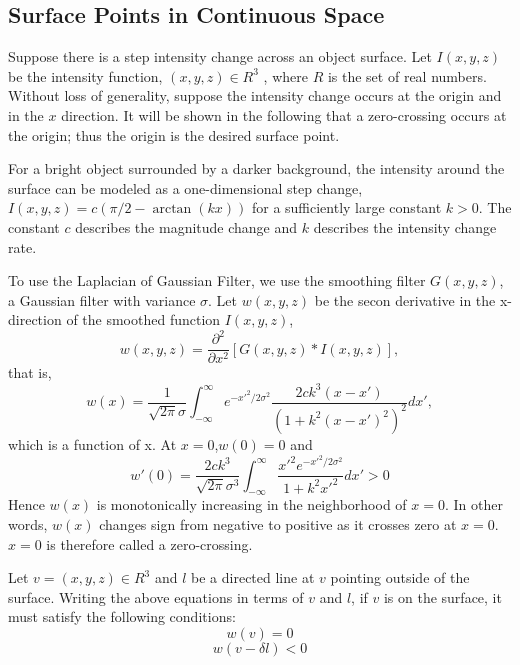 \documentclass{article}
\begin{document}
\subsection{Surface Points in Continuous Space}
Suppose there is a step intensity change across an object surface. Let $I(x, y,
z)$ be the intensity function, $(x, y, z)\in  R^3$ , where $R$ is the set of real
numbers. Without loss of generality, suppose the intensity change occurs at the
origin and in the $x$ direction. It will be shown in the following that a
zero-crossing occurs at the origin; thus the origin is the desired surface
point.\par
For a bright object surrounded by a darker background, the intensity
around the surface can be modeled as a one-dimensional step change, $I(x, y,
z)=c(\pi / 2 - \arctan (kx))$ for a sufficiently large constant $k > 0$. The constant $c$
describes the magnitude change and $k$ describes the intensity change rate.\par
To use the Laplacian of Gaussian Filter, we use the smoothing filter $G(x,y,z)$,
a Gaussian filter with variance $\sigma$. Let $w(x,y,z)$ be the secon derivative
in the x-direction of the smoothed function $I(x,y,z)$,
\begin{equation}
  w(x,y,z) = \frac {\partial ^2}{\partial x^2}[G(x,y,z)*I(x,y,z)],
\end{equation}
that is,
\begin{equation}
  w(x) = \frac {1}{\sqrt{2\pi}\sigma} \int_{-\infty}^{\infty} e^{-x'^{2} /
    2\sigma^2} \frac {2ck^3(x-x')}{(1+k^2(x-x')^2)^2} dx',
\end{equation}
which is a function of x. At $x=0$,$w(0)=0$ and
\begin{equation}
  w'(0) = \frac {2ck^3}{\sqrt{2\pi}\sigma^3}\int _{-\infty}^{\infty} \frac {x'^2
    e^{-x'^{2} /2\sigma^2}}{1+k^2x'^2}dx' >0
\end{equation}
Hence $w(x)$ is monotonically increasing in the neighborhood of $x=0$. In other
words, $w(x)$ changes sign from negative to positive as it crosses zero at
$x=0$. $x=0$ is therefore called a zero-crossing.\par
Let $v = (x,y,z) \in R^3$ and $l$ be a directed line at $v$ pointing outside of the
surface. Writing the above equations in terms of $v$ and $l$, if $v$ is on the
surface, it must satisfy the following conditions:
\begin{equation*}
  w(v) = 0
\end{equation*}
\begin{equation}
    w(v-\delta l) < 0
\end{equation}
\end{document}
